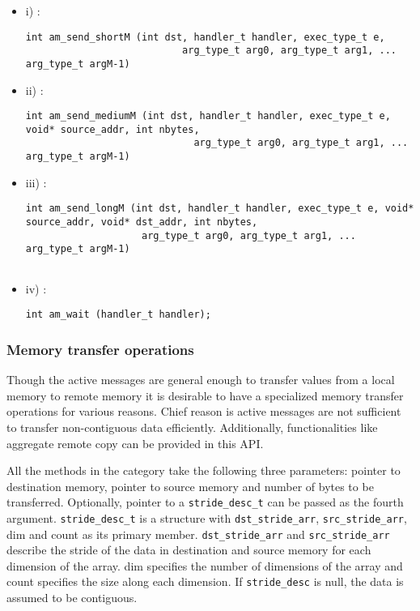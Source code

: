 \begin {itemize}

\item i) :
\begin{verbatim}
int am_send_shortM (int dst, handler_t handler, exec_type_t e,
	                       arg_type_t arg0, arg_type_t arg1, ... arg_type_t argM-1)

\end{verbatim}

\item ii) :             
\begin{verbatim}
int am_send_mediumM (int dst, handler_t handler, exec_type_t e, void* source_addr, int nbytes, 
	                         arg_type_t arg0, arg_type_t arg1, ... arg_type_t argM-1)

\end{verbatim}	
\item iii) : 

\begin{verbatim}
int am_send_longM (int dst, handler_t handler, exec_type_t e, void* source_addr, void* dst_addr, int nbytes,
		 	        arg_type_t arg0, arg_type_t arg1, ... arg_type_t argM-1)
	
\end{verbatim}

\item iv) : 
\begin{verbatim}
int am_wait (handler_t handler);
\end{verbatim}

\end {itemize}


\subsubsection {Memory transfer operations}

Though the active messages are general enough to transfer values from a local memory to
remote memory it is desirable to have a specialized memory transfer operations for 
various reasons. Chief reason is active messages are not sufficient to transfer non-contiguous data
efficiently. Additionally, functionalities like aggregate remote copy can be provided in
this API. 

All the methods in the category take the following three parameters: pointer to destination
memory, pointer to source memory and number of bytes to be transferred. Optionally,
pointer to a {\tt stride\_desc\_t}  can be passed as the fourth argument. {\tt stride\_desc\_t} 
is a structure with  {\tt dst\_stride\_arr}, {\tt src\_stride\_arr}, dim and count as its
primary member. {\tt dst\_stride\_arr} and {\tt src\_stride\_arr}  describe the stride
of the data in destination and source memory for each dimension of the array. 
dim specifies the number of dimensions of the array and count specifies the size
along each dimension. If {\tt stride\_desc} is null, the data is assumed to be contiguous. 


